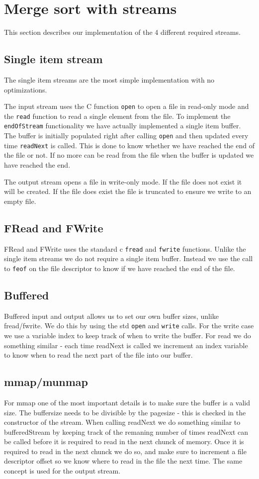 \section{Merge sort with streams}
This section describes our implementation of the 4 different required streams. 

\subsection{Single item stream}
The single item streams are the most simple implementation with no optimizations.

The input stream uses the C function \texttt{open} to open a file in read-only mode and the \texttt{read} function to read a single element from the file. To implement the \texttt{endOfStream} functionality we have actually implemented a single item buffer. The buffer is initially populated right after calling \texttt{open} and then updated every time \texttt{readNext} is called. This is done to know whether we have reached the end of the file or not. If no more can be read from the file when the buffer is updated we have reached the end.

The output stream opens a file in write-only mode. If the file does not exist it will be created. If the file does exist the file is truncated to ensure we write to an empty file.

\subsection{FRead and FWrite}
FRead and FWrite uses the standard c \texttt{fread} and \texttt{fwrite} functions. Unlike the single item streams we do not require a single item buffer. Instead we use the call to \texttt{feof} on the file descriptor to know if we have reached the end of the file. 


\subsection{Buffered}
Buffered input and output allows us to set our own buffer sizes, unlike fread/fwrite. We do this by using the std \texttt{open} and \texttt{write} calls. For the write case we use a variable index to keep track of when to write the buffer. For read we do something similar - each time readNext is called we increment an index variable to know when to read the next part of the file into our buffer.  	


\subsection{mmap/munmap}
For mmap one of the most important details is to make sure the buffer is a valid size. The buffersize needs to be divisible by the pagesize - this is checked in the constructor of the stream. When calling readNext we do something similar to bufferedStream by keeping track of the remaning number of times readNext can be called before it is required to read in the next chunck of memory.     
Once it is required to read in the next chunck we do so, and make sure to increment a file descriptor offset so we know where to read in the file the next time. The same concept is used for the output stream.
